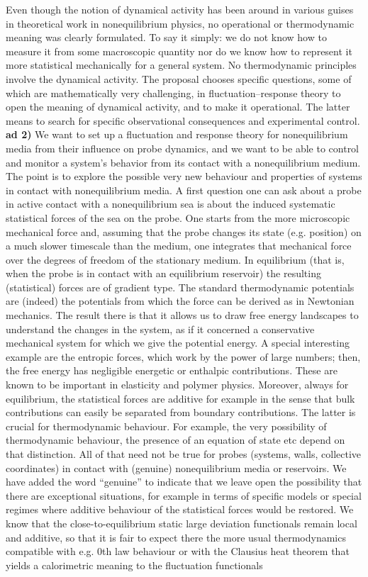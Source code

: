 Even though the notion of dynamical activity has been around in various guises in theoretical work in nonequilibrium physics, no operational or thermodynamic meaning was clearly formulated. To say it simply: we do not know how to measure it from some macroscopic quantity nor do we know how to represent it more statistical mechanically for a general system. No thermodynamic principles involve the dynamical activity.  The proposal chooses specific questions, some of which are mathematically very challenging, in fluctuation–response theory to open the meaning of dynamical activity, and to make it operational. The latter means to search for specific observational consequences and experimental control.\\
{\bf ad 2)} We want to set up a fluctuation and response theory for nonequilibrium media from their influence on probe  dynamics, and we want to be able to control and monitor a system’s behavior from its contact with a nonequilibrium medium. The point is to explore the possible very new behaviour and properties of systems in contact with nonequilibrium media. A first question one can ask about a probe in active contact with a nonequilibrium sea is about the induced systematic statistical forces of the sea on the probe.  One starts from the more microscopic mechanical force and, assuming that the probe changes its state (e.g. position) on a much slower timescale than the medium, one integrates that mechanical force over the degrees of freedom of the stationary medium.  In equilibrium (that is, when the probe is in contact with an equilibrium reservoir) the resulting (statistical) forces are of gradient type.  The standard thermodynamic potentials are (indeed) the potentials from which the force can be derived as in Newtonian mechanics. The result there is that it allows us to draw free energy landscapes to understand the changes in the system, as if it concerned a conservative mechanical system for which we give the potential energy.  A special interesting example are the entropic forces, which work by the power of large numbers; then, the free energy has negligible energetic or enthalpic contributions.  These are known to be important in elasticity and polymer physics. Moreover, always for equilibrium, the statistical forces are additive for example in the sense that bulk contributions can easily be separated from boundary contributions.  The latter is crucial for thermodynamic behaviour.  For example, the very possibility of thermodynamic behaviour, the presence of an equation of state etc depend on that distinction.  All of that need not be true for probes (systems, walls, collective coordinates) in contact with (genuine) nonequilibrium media or reservoirs.  We have added the word “genuine” to indicate that we leave open the possibility that there are exceptional situations, for example in terms of specific models or special regimes where additive behaviour of the statistical forces would be restored.  We know that the close-to-equilibrium static large deviation functionals remain local and additive, so that it is fair to expect there the more usual thermodynamics compatible with e.g. 0th law behaviour or with the Clausius heat theorem that yields a calorimetric meaning to the fluctuation functionals 
